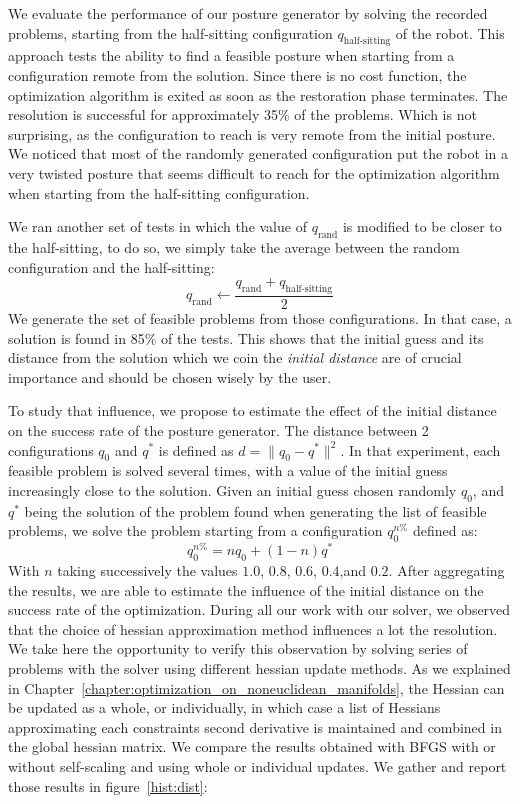 We evaluate the performance of our posture generator by solving the recorded problems, starting from the half-sitting configuration $q_\text{half-sitting}$ of the robot.
This approach tests the ability to find a feasible posture when starting from a configuration remote from the solution.
Since there is no cost function, the optimization algorithm is exited as soon as the restoration phase terminates.
The resolution is successful for approximately 35\% of the problems.
Which is not surprising, as the configuration to reach is very remote from the initial posture.
We noticed that most of the randomly generated configuration put the robot in a very twisted posture that seems difficult to reach for the optimization algorithm when starting from the half-sitting configuration.

We ran another set of tests in which the value of $q_\text{rand}$ is modified to be closer to the half-sitting, to do so, we simply take the average between the random configuration and the half-sitting:
\begin{equation}
  q_\text{rand} \leftarrow \frac{q_\text{rand}+q_\text{half-sitting}}{2}
\end{equation}
We generate the set of feasible problems from those configurations.
In that case, a solution is found in 85\% of the tests.
This shows that the initial guess and its distance from the solution which we coin the \emph{initial distance} are of crucial importance and should be chosen wisely by the user.

To study that influence, we propose to estimate the effect of the initial distance on the success rate of the posture generator.
The distance between 2 configurations $q_0$ and $q^*$ is defined as $d=\|q_0-q^*\|^2$.
In that experiment, each feasible problem is solved several times, with a value of the initial guess increasingly close to the solution.
Given an initial guess chosen randomly $q_0$, and $q^*$ being the solution of the problem found when generating the list of feasible problems, we solve the problem starting from a configuration $q_0^{n\%}$ defined as:
\begin{equation}
  q_0^{n\%} = n q_0 + (1-n)q^*
\end{equation}
With $n$ taking successively the values $1.0$, $0.8$, $0.6$, $0.4$,and $0.2$.
After aggregating the results, we are able to estimate the influence of the initial distance on the success rate of the optimization.
During all our work with our solver, we observed that the choice of hessian approximation method influences a lot the resolution.
We take here the opportunity to verify this observation by solving series of problems with the solver using different hessian update methods.
As we explained in Chapter~\ref{chapter:optimization_on_noneuclidean_manifolds}, the Hessian can be updated as a whole, or individually, in which case a list of Hessians approximating each constraints second derivative is maintained and combined in the global hessian matrix.
We compare the results obtained with BFGS with or without self-scaling and using whole or individual updates.
We gather and report those results in figure~\ref{hist:dist}:


